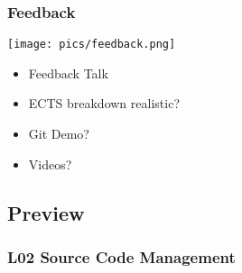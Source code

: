 \begin{frame}
	\frametitle{Feedback}

	\hfill \texttt{[image: pics/feedback.png]}
	\vspace{-1cm}
	\begin{itemize}
		\item Feedback Talk
		\item ECTS breakdown realistic?
		\item Git Demo?
		\item Videos?
	\end{itemize}
\end{frame}

\subsection{Preview}

\begin{frame}
	\frametitle{L02 Source Code Management}
\end{frame}



\nocite{raab2017introducing}

\appendix

\begin{frame}[allowframebreaks]
	
	
\end{frame}




